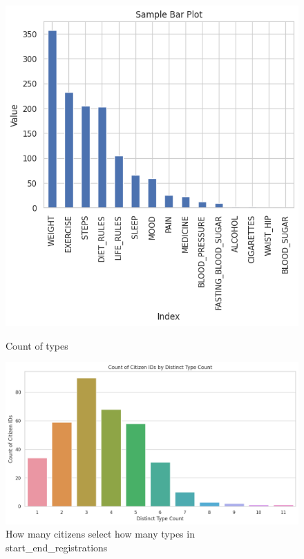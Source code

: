 \documentclass[12pt]{article}
\begin{document}
\begin{figure}[h]
    \centering
    \begin{minipage}{0.45\linewidth}
        \includegraphics[width=\linewidth]{images/reg_types.png}
        \caption{Count of types}
        \label{fig:countoftypes}
    \end{minipage}
    \hfill
    \begin{minipage}{0.45\linewidth}
        \includegraphics[width=\linewidth]{images/start_end_reg_count.png}
        \caption{How many citizens select how many types in start\_end\_registrations}
        \label{fig:howmanytypes}
    \end{minipage}
\end{figure}
\end{document}
